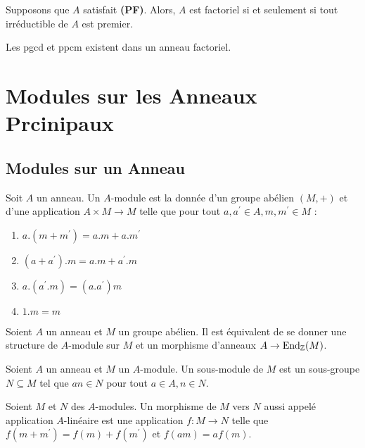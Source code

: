 \documentclass{cours}
\begin{document}
\begin{proposition}
    Supposons que $A$ satisfait \textbf{(PF)}. Alors, $A$ est factoriel si et seulement si tout irréductible de $A$ est premier.
\end{proposition}

\begin{lemma}
    Les pgcd et ppcm existent dans un anneau factoriel.
\end{lemma}


\section{Modules sur les Anneaux Prcinipaux}
\subsection{Modules sur un Anneau}
\begin{definition}
    Soit $A$ un anneau. Un $A$-module est la donnée d'un groupe abélien $\left(M, +\right)$ et d'une application $A \times M \rightarrow M$ telle que pour tout $a, a^{'} \in A, m, m^{'} \in M$ :
    \begin{enumerate}
        \item $a.(m+m^{'}) = a.m + a.m^{'}$
        \item $(a+a^{'}).m = a.m + a^{'}.m$
        \item $a.(a^{'}.m) = (a.a^{'})m$
        \item $1.m = m$
    \end{enumerate}
\end{definition}

\begin{proposition}
    Soient $A$ un anneau et $M$ un groupe abélien. Il est équivalent de se donner une structure de $A$-module sur $M$ et un morphisme d'anneaux $A \rightarrow \text{End}_{\mathbb{Z}}(M)$.
\end{proposition}

\begin{definition}
    Soient $A$ un anneau et $M$ un $A$-module. Un sous-module de $M$ est un sous-groupe $N \subseteq M$ tel que $an \in N$ pour tout $a \in A, n \in N$.
\end{definition}
\begin{definition}
    Soient $M$ et $N$ des $A$-modules. Un morphisme de $M$ vers $N$ aussi appelé application $A$-linéaire est une application $f : M \to N$ telle que $f(m + m^{'}) = f(m) + f(m^{'})$ et $f(am) = af(m)$.
\end{definition}
\end{document}
